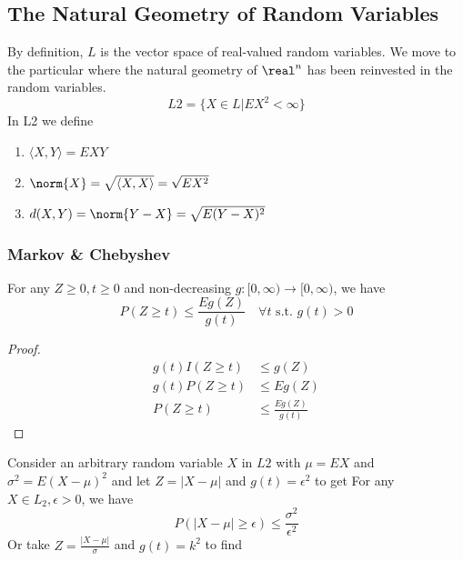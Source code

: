 \documentclass[11pt]{article}
\numberwithin{equation}{section}
\begin{document}
\subsection{The Natural Geometry of Random Variables}
By definition, $L$ is the vector space of real-valued random variables. We move to the particular  where the natural geometry of $\real^n$ has been reinvested in the random variables.
\begin{equation}
	L2 = \{X \in L |EX^2 < \infty\}
\end{equation}
In L2 we define 
\begin{enumerate}
	\item {} $\langle X, Y \rangle = EXY$
	\item {} $\norm{X} = \sqrt{\langle X, X \rangle} = \sqrt{EX^2}$
	\item {} $d(X, Y) = \norm{Y - X} = \sqrt{E(Y - X)^2}$
\end{enumerate}

\subsubsection{Markov \& Chebyshev}

For any $Z \geq 0, t \geq 0$ and non-decreasing $g: [0, \infty) \rightarrow [0, \infty)$, we have
\begin{equation}
	P(Z \geq t) \leq \frac{Eg(Z)}{g(t)} \quad \forall t \text{ s.t. } g(t) > 0
\end{equation}
\begin{proof}
\begin{align}
	g(t)I(Z\geq t) &\leq g(Z) \\
	g(t)P(Z \geq t) &\leq Eg(Z) \tag{applying $E$ to both sides} \\
	P(Z \geq t) &\leq \frac{Eg(Z)}{g(t)}
\end{align}
\end{proof}

\noindent Consider an arbitrary random variable $X$ in $L2$ with $\mu = EX$ and $\sigma^2 = E(X - \mu)^2$ and let $Z = |X - \mu|$ and $g(t) = \epsilon^2$ to get
\corollary[Chebyshev I] For any $X \in L_2, \epsilon > 0$, we have
\begin{equation}
	P(|X - \mu| \geq \epsilon) \leq \frac{\sigma^2}{\epsilon^2}
\end{equation}
Or take $Z = \frac{|X - \mu|}{\sigma}$ and $g(t) = k^2$ to find
\end{document}
